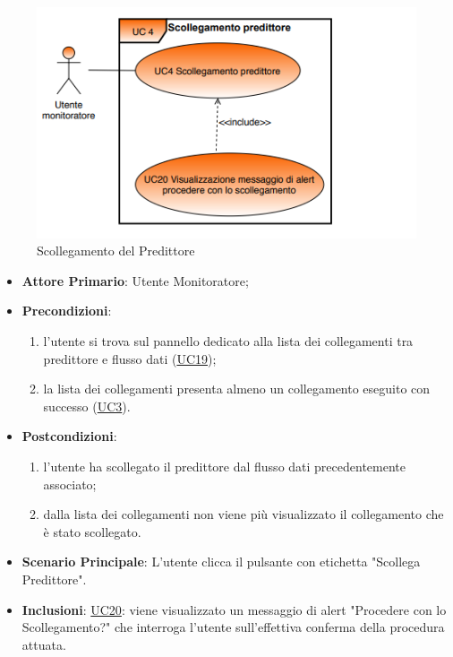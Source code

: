 		\begin{figure}[H]
		\centering
		\includegraphics[scale=0.80]{../Analisi_dei_requisiti/img/Diagrammi_UML/UC4_Scollegamento_predittore.png}
		\caption{Scollegamento del Predittore}
		\end{figure}	

		\begin{itemize}
			\item\textbf{Attore Primario}: Utente Monitoratore;
			\item\textbf{Precondizioni}: 
				\begin{enumerate}
					\item l'utente si trova sul pannello dedicato alla lista dei collegamenti tra predittore e flusso dati (\hyperref[par:UC19]{UC19});
					\item la lista dei collegamenti presenta almeno un collegamento eseguito con successo  (\hyperref[par:UC3]{UC3}).
				\end{enumerate}
			\item\textbf{Postcondizioni}: 
				\begin{enumerate}
					\item l’utente ha scollegato il predittore dal flusso dati precedentemente associato; 
					\item dalla lista dei collegamenti non viene più visualizzato il collegamento che è stato scollegato.
				\end{enumerate}
			\item\textbf{Scenario Principale}: L'utente clicca il pulsante con etichetta "Scollega Predittore".
			\item\textbf{Inclusioni}: \hyperref[par:UC20]{UC20}: viene visualizzato un messaggio di alert "Procedere con lo  Scollegamento?" che interroga l'utente sull'effettiva conferma della procedura attuata. 
		\end{itemize}	


